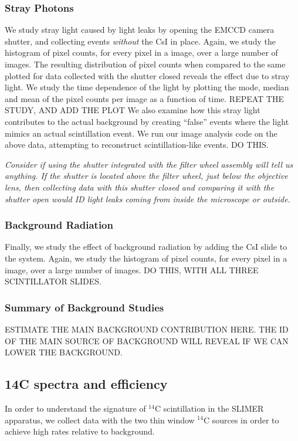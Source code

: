\documentclass[11pt]{article}
\newcommand{\nuc}[2]{\ensuremath{^{#1}}#2}
\begin{document}
\subsubsection{Stray Photons}
We study stray light caused by light leaks by opening the EMCCD camera shutter, and collecting events \emph{without} the CsI in place. Again, we study the histogram of pixel counts, for every pixel in a image, over a large number of images. The resulting distribution of pixel counts when compared to the same plotted for data collected with the shutter closed reveals the effect due to stray light. We study the time dependence of the light by plotting the mode, median and mean of the pixel counts per image
as a function of time. REPEAT THE STUDY, AND ADD THE PLOT
We also examine how this stray light contributes to the actual background by creating ``false'' events where the light mimics an actual scintillation event.   We run our image analysis code on the above data, attempting to reconstruct scintillation-like events. DO THIS. 

\emph{Consider if using the shutter integrated with the filter wheel assembly will tell us anything. If the shutter is located above the filter wheel, just below the objective lens, then collecting data with this shutter closed and comparing it with the shutter open would ID light leaks coming from inside the microscope or outside.}

\subsubsection{Background Radiation}
Finally, we study the effect of background radiation by adding the CsI slide to the system. Again, we study the histogram of pixel counts, for every pixel in a image, over a large number of images.
DO THIS, WITH ALL THREE SCINTILLATOR SLIDES. 

\subsubsection{Summary of Background Studies}
ESTIMATE THE MAIN BACKGROUND CONTRIBUTION HERE. THE ID OF THE MAIN SOURCE OF BACKGROUND WILL REVEAL IF WE CAN LOWER THE BACKGROUND.

\subsection{14C spectra and efficiency}%

In order to understand the signature of \nuc{14}{C} scintillation in the SLIMER apparatus, we collect data with the two thin window \nuc{14}{C} sources in order to achieve high rates relative to background. 
\end{document}
